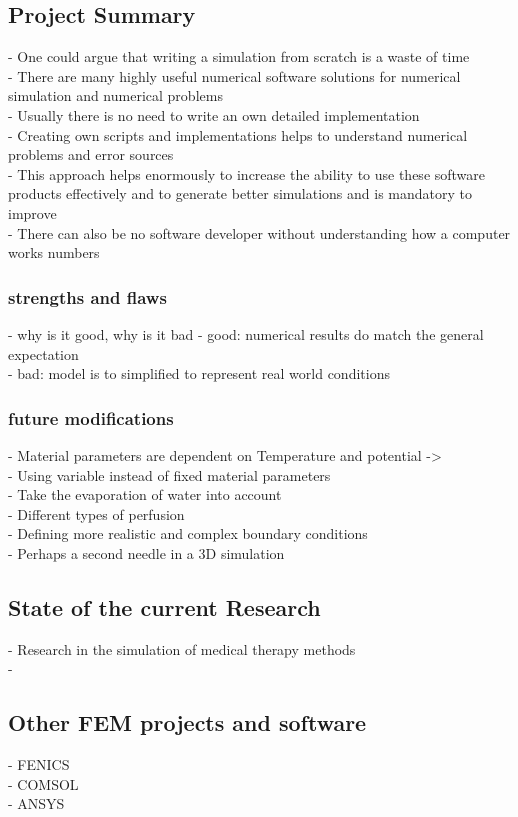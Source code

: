 \documentclass[parskip=half, titlepage=yes, 12pt, BCOR=12mm, DIV=calc]{scrartcl}
\begin{document}
\subsection{Project Summary}
- One could argue that writing a simulation from scratch is a waste of time \\
- There are many highly useful numerical software solutions for numerical simulation and numerical problems \\
- Usually there is no need to write an own detailed implementation \\
- Creating own scripts and implementations helps to understand numerical problems and error sources \\
- This approach helps enormously to increase the ability to use these software products effectively and to generate better simulations and is mandatory to improve \\
- There can also be no software developer without understanding how a computer works numbers \\

\subsubsection{strengths and flaws}
- why is it good, why is it bad
- good: numerical results do match the general expectation \\
- bad: model is to simplified to represent real world conditions \\

\subsubsection{future modifications}
- Material parameters are dependent on Temperature and potential -> \\
- Using variable instead of fixed material parameters \\
- Take the evaporation of water into account \\ 
- Different types of perfusion \\
- Defining more realistic and complex boundary conditions \\
- Perhaps a second needle in a 3D simulation \\

\subsection{State of the current Research}
- Research in the simulation of medical therapy methods \\
- 


\subsection{Other FEM projects and software}

- FENICS \\
- COMSOL \\
- ANSYS \\

\newpage


\clearpage
\nocite{*}
\printbibliography

\newpage

\appendix

 
\end{document}
